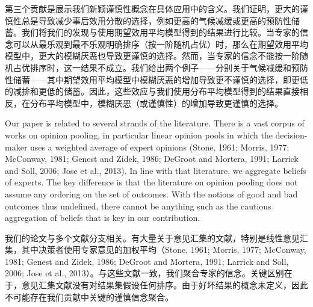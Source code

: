 \documentclass[12pt,a4paper]{article}
\newenvironment{original}
  {\par\noindent\ignorespaces}
  {\par}
\newenvironment{translation}
  {\par\noindent{\color{transblue}\ignorespaces}}
  {\par\medskip}
\begin{document}
\begin{translation}
第三个贡献是展示我们新颖谨慎性概念在具体应用中的含义。我们证明，更大的谨慎性总是导致减少事后效用分散的选择，例如更高的气候减缓或更高的预防性储蓄。我们将我们的发现与使用期望效用平均模型得到的结果进行比较。当专家的信念可以从最乐观到最不乐观明确排序（按一阶随机占优）时，那么在期望效用平均模型中，更大的模糊厌恶也导致更谨慎的选择。然而，当专家的信念不能按一阶随机占优排序时，这一结果不成立。我们给出两个例子——分别关于气候减缓和预防性储蓄——其中期望效用平均模型中模糊厌恶的增加导致更不谨慎的选择，即更低的减排和更低的储蓄。因此，这些效应与我们使用分布平均模型得到的结果直接相反，在分布平均模型中，模糊厌恶（或谨慎性）的增加导致更谨慎的选择。
\end{translation}

\begin{original}
Our paper is related to several strands of the literature. There is a vast corpus of works on opinion pooling, in particular linear opinion pools in which the decision-maker uses a weighted average of expert opinions (Stone, 1961; Morris, 1977; McConway, 1981; Genest and Zidek, 1986; DeGroot and Mortera, 1991; Larrick and Soll, 2006; Jose et al., 2013). In line with that literature, we aggregate beliefs of experts. The key difference is that the literature on opinion pooling does not assume any ordering on the set of outcomes. With the notions of good and bad outcomes thus undefined, there cannot be anything such as the cautious aggregation of beliefs that is key in our contribution.
\end{original}

\begin{translation}
我们的论文与多个文献分支相关。有大量关于意见汇集的文献，特别是线性意见汇集，其中决策者使用专家意见的加权平均（Stone, 1961; Morris, 1977; McConway, 1981; Genest and Zidek, 1986; DeGroot and Mortera, 1991; Larrick and Soll, 2006; Jose et al., 2013）。与这些文献一致，我们聚合专家的信念。关键区别在于，意见汇集文献没有对结果集假设任何排序。由于好坏结果的概念未定义，因此不可能存在我们贡献中关键的谨慎信念聚合。
\end{translation}
\end{document}
